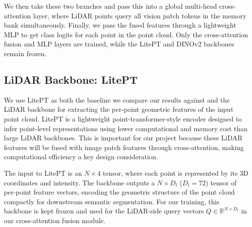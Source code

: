 \documentclass[10pt,twocolumn,letterpaper]{article}
\begin{document}
We then take these two branches and pass this into a global multi-head cross-attention layer, where LiDAR points query all vision patch tokens in the memory bank simultaneously. Finally, we pass the fused features through a lightweight MLP to get class logits for each point in the point cloud. Only the cross-attention fusion and MLP layers are trained, while the LitePT and DINOv2 backbones remain frozen.


\subsection{LiDAR Backbone: LitePT}
We use LitePT as both the baseline we compare our results against and the LiDAR backbone for extracting the per-point geometric features of the input point cloud. LitePT is a lightweight point-transformer-style encoder designed to infer point-level representations using lower computational and memory cost than large LiDAR backbones. This is important for our project because these LiDAR features will be fused with image patch features through cross-attention, making computational efficiency a key design consideration.

The input to LitePT is an $N \times 4$ tensor, where each point is represented by its 3D coordinates and intensity. The backbone outputs a $N \times D_l$ ($D_l = 72$) tensor of per-point feature vectors, encoding the geometric structure of the point cloud compactly for downstream semantic segmentation. For our training, this backbone is kept frozen and used for the LiDAR-side query vectors $Q \in \mathbb{R}^{N \times D_l}$ in our cross-attention fusion module.
\end{document}
